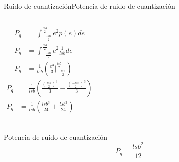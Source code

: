  \begin{frame}{Ruido de cuantización}{Potencia de ruido de cuantización}
    \begin{columns}[onlytextwidth]
       \begin{align*}
          P_q &= \int^\frac{lsb}{2}_{-\frac{lsb}{2}} e^2 p(e) de \\
          P_q &= \int^\frac{lsb}{2}_{-\frac{lsb}{2}} e^2 \frac{1}{lsb} de \\
          P_q &= \frac{1}{lsb}\left(\frac{e^3}{3} \Big\rvert^{\frac{lsb}{2}}_{-\frac{lsb}{2}}\right)
       \end{align*}
       \begin{align*}
          P_q &= \frac{1}{lsb}\left(\frac{(\frac{lsb}{2})^3}{3} - \frac{(\frac{-lsb}{2})^3}{3}\right)\\
          P_q &= \frac{1}{lsb} \left(\frac{lsb^3}{24} + \frac{lsb^3}{24}\right) \\
       \end{align*}
    \end{columns}
    \begin{block}{Potencia de ruido de cuantización}
       \begin{equation}
          P_q = \frac{lsb^2}{12}
       \end{equation}
    \end{block}
    \vfill
 \end{frame}
